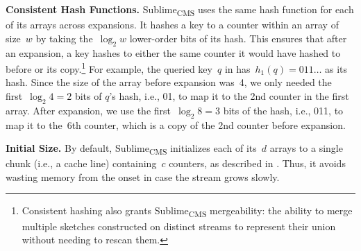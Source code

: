 \documentclass[sigconf]{acmart}
\newcommand{\sketch}{Sublime}
\newcommand{\sketchcms}{\sketch\textsubscript{CMS}\xspace}
\begin{document}
\textbf{Consistent Hash Functions.}
\sketchcms uses the same hash function for each of its arrays across expansions.
It hashes a key to a counter within an array of size~$w$ by taking the~$\log_2 w$ lower-order bits of its hash.
This ensures that after an expansion, a key hashes to either the same counter it would have hashed to before or its copy.\footnote{Consistent hashing also grants \sketchcms mergeability: the ability to merge multiple sketches constructed on distinct streams to represent their union without needing to rescan them.}
For example, the queried key~$q$ in  has~$h_1(q)=011\dots$ as its hash.
Since the size of the array before expansion was~4, we only needed the first~$\log_2 4=2$ bits of $q$'s hash, i.e., 01, to map it to the 2nd counter in the first array.
After expansion, we use the first~$\log_2 8=3$ bits of the hash, i.e., 011, to map it to the~6th counter, which is a copy of the 2nd counter before expansion.

\textbf{Initial Size.}
By default, \sketchcms initializes each of its~$d$ arrays to a single chunk
(i.e., a cache line) containing~$c$ counters, as described in
. Thus, it
avoids wasting memory from the onset in case the stream grows slowly.
\end{document}
